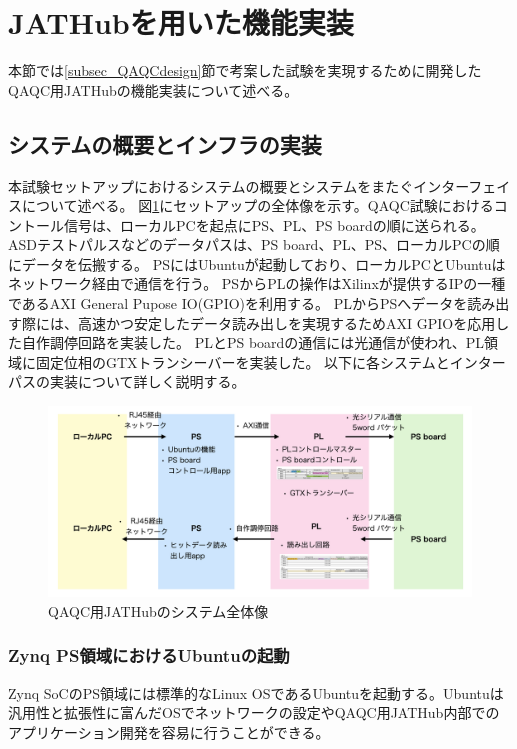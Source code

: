 \section{JATHubを用いた機能実装}
本節では\ref{subsec_QAQCdesign}節で考案した試験を実現するために開発したQAQC用JATHubの機能実装について述べる。

\subsection{システムの概要とインフラの実装}
\label{subsec_infra}
本試験セットアップにおけるシステムの概要とシステムをまたぐインターフェイスについて述べる。
図\ref{JAThubinfra}にセットアップの全体像を示す。QAQC試験におけるコントール信号は、ローカルPCを起点にPS、PL、PS boardの順に送られる。
ASDテストパルスなどのデータパスは、PS board、PL、PS、ローカルPCの順にデータを伝搬する。
PSにはUbuntuが起動しており、ローカルPCとUbuntuはネットワーク経由で通信を行う。
PSからPLの操作はXilinxが提供するIPの一種であるAXI General Pupose IO(GPIO)を利用する。
PLからPSへデータを読み出す際には、高速かつ安定したデータ読み出しを実現するためAXI GPIOを応用した自作調停回路を実装した。
PLとPS boardの通信には光通信が使われ、PL領域に固定位相のGTXトランシーバーを実装した。
以下に各システムとインターパスの実装について詳しく説明する。

\begin{figure} 
\centering
\includegraphics[width=16cm]{fig/QAQC/JAThubinfra.png}
\caption[QAQC用JATHubのシステム全体像]{QAQC用JATHubのシステム全体像}
\label{JAThubinfra}
\end{figure}

\subsubsection{Zynq PS領域におけるUbuntuの起動}
\label{subsubsec_ubuntu}
\baselineskip
Zynq SoCのPS領域には標準的なLinux OSであるUbuntuを起動する。Ubuntuは汎用性と拡張性に富んだOSでネットワークの設定やQAQC用JATHub内部でのアプリケーション開発を容易に行うことができる。\par

